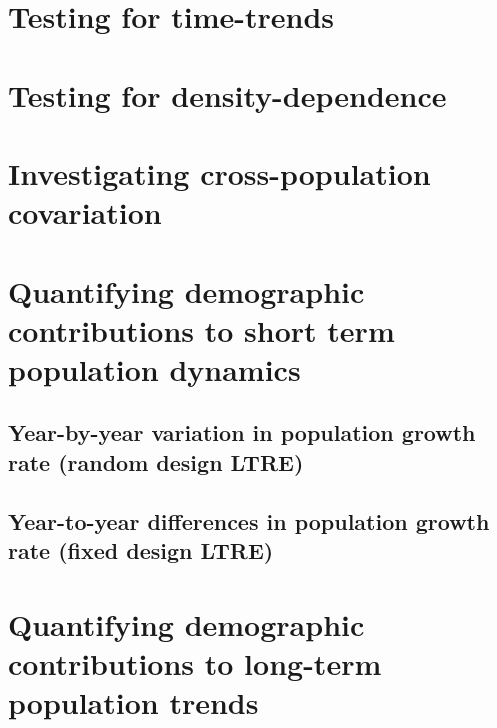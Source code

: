 \documentclass[
]{book}
\begin{document}
\hypertarget{testing-for-time-trends}{%
\section{Testing for time-trends}\label{testing-for-time-trends}}

\hypertarget{testing-for-density-dependence}{%
\section{Testing for density-dependence}\label{testing-for-density-dependence}}

\hypertarget{investigating-cross-population-covariation}{%
\section{Investigating cross-population covariation}\label{investigating-cross-population-covariation}}

\hypertarget{quantifying-demographic-contributions-to-short-term-population-dynamics}{%
\section{Quantifying demographic contributions to short term population dynamics}\label{quantifying-demographic-contributions-to-short-term-population-dynamics}}

\hypertarget{year-by-year-variation-in-population-growth-rate-random-design-ltre}{%
\subsection{Year-by-year variation in population growth rate (random design LTRE)}\label{year-by-year-variation-in-population-growth-rate-random-design-ltre}}

\hypertarget{year-to-year-differences-in-population-growth-rate-fixed-design-ltre}{%
\subsection{Year-to-year differences in population growth rate (fixed design LTRE)}\label{year-to-year-differences-in-population-growth-rate-fixed-design-ltre}}

\hypertarget{quantifying-demographic-contributions-to-long-term-population-trends}{%
\section{Quantifying demographic contributions to long-term population trends}\label{quantifying-demographic-contributions-to-long-term-population-trends}}
\end{document}
